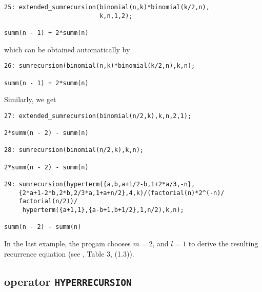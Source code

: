 {\small
\begin{verbatim}
25: extended_sumrecursion(binomial(n,k)*binomial(k/2,n),
                          k,n,1,2);

summ(n - 1) + 2*summ(n)
\end{verbatim}
}\noindent
which can be obtained automatically by
{\small
\begin{verbatim}
26: sumrecursion(binomial(n,k)*binomial(k/2,n),k,n);

summ(n - 1) + 2*summ(n)
\end{verbatim}
}\noindent
Similarly, we get
{\small
\begin{verbatim}
27: extended_sumrecursion(binomial(n/2,k),k,n,2,1);

2*summ(n - 2) - summ(n)

28: sumrecursion(binomial(n/2,k),k,n);

2*summ(n - 2) - summ(n)

29: sumrecursion(hyperterm({a,b,a+1/2-b,1+2*a/3,-n},
    {2*a+1-2*b,2*b,2/3*a,1+a+n/2},4,k)/(factorial(n)*2^(-n)/
    factorial(n/2))/
     hyperterm({a+1,1},{a-b+1,b+1/2},1,n/2),k,n);

summ(n - 2) - summ(n)
\end{verbatim}
}\noindent
In the last example, the progam chooses $m=2$, and $l=1$ to derive the
resulting recurrence equation (see \cite{Koepf:94b}, Table 3, (1.3)).


\subsection{\REDUCE{} operator \texttt{HYPERRECURSION}}
\hypertarget{operator:HYPERRECURSION}{}
\hypertarget{operator:HYPERTERM}{}

